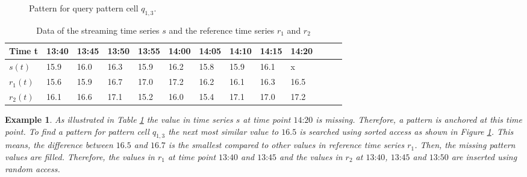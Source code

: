 \documentclass[abstracton,12pt,oneside]{scrreprt}
\newtheorem{example}{Example}
\begin{document}
\begin{figure}[H]
	
	\caption{Pattern for query pattern cell $q_{1,3}$.}\label{fillQQ}
\end{figure}


\begin{table}
\centering
	\begin{tabular}{ | l | l | l | l|l|l|l|l|l|l|l|l|p{0.5cm} |}
		\hline
		Time t & 13:40 & 13:45 &13:50 & 13:55 & 14:00 & 14:05 & 14:10 & 14:15 & 14:20 \\ \hline
		$s(t)$ & 15.9 & 16.0 &16.3 &15.9 & 16.2 & 15.8 & 15.9 & 16.1 & x \\ \hline
		$r_1(t)$ & 15.6 & 15.9 &16.7 & 17.0 & 17.2& 16.2 & \cellcolor[gray]{0.9}16.1 & \cellcolor[gray]{0.9}16.3 & \cellcolor[gray]{0.9}16.5 \\ \hline
		$r_2(t)$ & 16.1 & 16.6 &17.1 & 15.2 & 16.0 & 15.4 & \cellcolor[gray]{0.9}17.1 & \cellcolor[gray]{0.9}17.0 & \cellcolor[gray]{0.9}17.2 \\ \hline
		
	\end{tabular}

 \caption{Data of the streaming time series $s$ and the reference time series $r_1$ and $r_2$}\label{table}
\end{table}


\begin{example}
	As illustrated in Table \ref{table} the value in time series $s$ at time point $\text{14:20}$ is missing. Therefore, a pattern is anchored at this time point. To find a pattern for pattern cell $q_{1,3}$ the next most similar value to $16.5$ is searched using sorted access as shown in Figure \ref{fillQQ}. This means, the difference between $16.5$ and $16.7$ is the smallest compared to other values in reference time series $r_1$. Then, the missing pattern values are filled. Therefore, the values in $r_1$ at time point $\text{13:40}$ and $\text{13:45}$ and the values in $r_2$ at $\text{13:40}$, $\text{13:45}$ and $\text{13:50}$ are inserted using random access. 
\end{example} 
\end{document}
